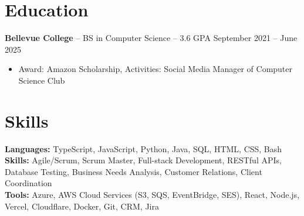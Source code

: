 \documentclass[11pt]{article}       %
\begin{document}

\vspace{-18.5pt}

\section*{Education}
\textbf{Bellevue College} -- BS in Computer Science -- 3.6 GPA \hfill September 2021 -- June 2025\\
\vspace{-9pt}
\begin{itemize}
  \item Award: Amazon Scholarship, Activities: Social Media Manager of Computer Science Club
\end{itemize}

\vspace{-18.5pt}

\section*{Skills}
\textbf{Languages:} TypeScript, JavaScript, Python, Java, SQL, HTML, CSS, Bash \\
\textbf{Skills:} Agile/Scrum, Scrum Master, Full-stack Development, RESTful APIs, Database Testing, Business Needs Analysis, Customer Relations, Client Coordination \\
\textbf{Tools:} Azure, AWS Cloud Services (S3, SQS, EventBridge, SES), React, Node.js, Vercel, Cloudflare, Docker, Git, CRM, Jira \\

\vspace{-6.5pt}
\end{document}
